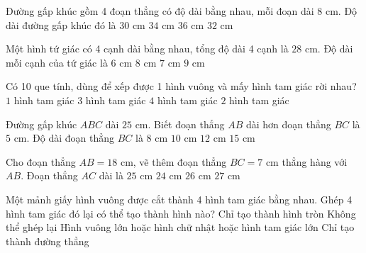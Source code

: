 \begin{ex} %
Đường gấp khúc gồm 4 đoạn thẳng có độ dài bằng nhau, mỗi đoạn dài $8\text{ cm}$. Độ dài đường gấp khúc đó là
\choice
{$30\text{ cm}$}
{$34\text{ cm}$}
{$36\text{ cm}$}
{\True $32\text{ cm}$}
\end{ex}

\begin{ex} %
Một hình tứ giác có 4 cạnh dài bằng nhau, tổng độ dài 4 cạnh là $28\text{ cm}$. Độ dài mỗi cạnh của tứ giác là
\choice
{$6\text{ cm}$}
{$8\text{ cm}$}
{\True $7\text{ cm}$}
{$9\text{ cm}$}
\end{ex}

\begin{ex} %
Có 10 que tính, dùng để xếp được 1 hình vuông và mấy hình tam giác rời nhau?
\choice
{$1$ hình tam giác}
{$3$ hình tam giác}
{$4$ hình tam giác}
{\True $2$ hình tam giác}
\end{ex}

\begin{ex} %
Đường gấp khúc $ABC$ dài $25\text{ cm}$. Biết đoạn thẳng $AB$ dài hơn đoạn thẳng $BC$ là $5\text{ cm}$. Độ dài đoạn thẳng $BC$ là
\choice
{$8\text{ cm}$}
{\True $10\text{ cm}$}
{$12\text{ cm}$}
{$15\text{ cm}$}
\end{ex}

\begin{ex} %
Cho đoạn thẳng $AB = 18\text{ cm}$, vẽ thêm đoạn thẳng $BC = 7\text{ cm}$ thẳng hàng với $AB$. Đoạn thẳng $AC$ dài là
\choice
{\True $25\text{ cm}$}
{$24\text{ cm}$}
{$26\text{ cm}$}
{$27\text{ cm}$}
\end{ex}

\begin{ex} %
Một mảnh giấy hình vuông được cắt thành 4 hình tam giác bằng nhau. Ghép 4 hình tam giác đó lại có thể tạo thành hình nào?
\choice
{Chỉ tạo thành hình tròn}
{Không thể ghép lại}
{\True Hình vuông lớn hoặc hình chữ nhật hoặc hình tam giác lớn}
{Chỉ tạo thành đường thẳng}
\end{ex}

